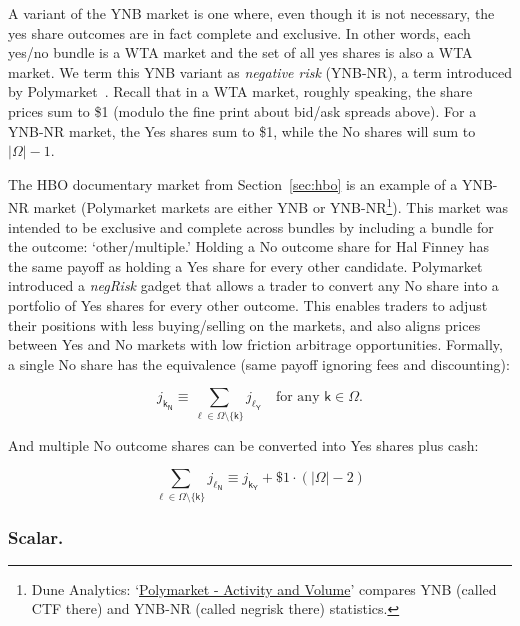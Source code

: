 A variant of the YNB market is one where, even though it is not necessary, the yes share outcomes are in fact complete and exclusive. In other words, each yes/no bundle is a WTA market and the set of all yes shares is also a WTA market. We term this YNB variant as \textit{negative risk} (YNB-NR), a term introduced by Polymarket~\cite{poly}. Recall that in a WTA market, roughly speaking, the share prices sum to \$1 (modulo the fine print about bid/ask spreads above). For a YNB-NR market, the Yes shares sum to \$1, while the No shares will sum to $|\Omega|-1$. 

The HBO documentary market from Section~\ref{sec:hbo} is an example of a YNB-NR market (Polymarket markets are either YNB or YNB-NR\footnote{Dune Analytics: `\href{https://dune.com/filarm/polymarket-activity}{Polymarket - Activity and Volume}' compares YNB (called CTF there) and YNB-NR (called negrisk there) statistics.}). This market was intended to be exclusive and complete across bundles by including a bundle for the outcome: `other/multiple.' Holding a No outcome share for Hal Finney has the same payoff as holding a Yes share for every other candidate. Polymarket introduced a \textit{negRisk} gadget that allows a trader to convert any No share into a portfolio of Yes shares for every other outcome. This enables traders to adjust their positions with less buying/selling on the markets, and also aligns prices between Yes and No markets with low friction arbitrage opportunities. Formally, a single No share has the equivalence (\ie same payoff ignoring fees and discounting):

\begin{equation}
j_{\mathsf{k_N}} \equiv \sum_{\ell \in \Omega\setminus\{\mathsf{k}\}} j_{\mathsf{\ell_Y}} \quad\text{for any }\mathsf{k}\in\Omega.
\end{equation}

And multiple No outcome shares can be converted into Yes shares plus cash:

\begin{equation}
\sum_{\ell \in \Omega\setminus\{\mathsf{k}\}} j_{\mathsf{\ell_N}}
\equiv
j_{\mathsf{k_Y}} + \$1\cdot(|\Omega|-2)
\end{equation}




\subsubsection{Scalar.}

